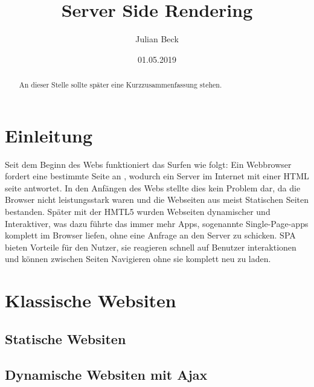 \documentclass[runningheads]{llncs}
\title{Server Side Rendering}
\author{Julian Beck}
\institute{Betreuer: Prof. Dr. rer. nat. Christian Zirpins}
\date{01.05.2019}
\begin{document}
\let\oldaddcontentsline\addcontentsline
\def\addcontentsline#1#2#3{}
\maketitle
\def\addcontentsline#1#2#3{\oldaddcontentsline{#1}{#2}{#3}}


\begin{abstract}
  An dieser Stelle sollte später eine Kurzzusammenfassung stehen.
\end{abstract}

\tableofcontents 
\newpage

\section{Einleitung}
\label{sec:Einleitung}
Seit dem Beginn des Webs funktioniert das Surfen wie folgt: Ein Webbrowser fordert eine bestimmte Seite an , wodurch ein Server im Internet mit einer HTML seite antwortet. In den Anfängen des Webs stellte dies kein Problem dar, da die Browser nicht leistungsstark waren und die Webseiten aus meist Statischen Seiten bestanden. Später mit der HMTL5 wurden Webseiten dynamischer und Interaktiver, was dazu führte das immer mehr Apps, sogenannte Single-Page-apps komplett im Browser liefen, ohne eine Anfrage an den Server zu schicken. SPA bieten Vorteile für den Nutzer, sie reagieren schnell auf Benutzer interaktionen und können zwischen Seiten Navigieren ohne sie komplett neu zu laden.



\section{Klassische Websiten}
\label{sec:Klassische Websiten}

\subsection{Statische Websiten}
\label{subsec:Statische Websiten}

\subsection{Dynamische Websiten mit Ajax}
\label{subsec:Dynamische Websiten mit Ajax}
\end{document}

